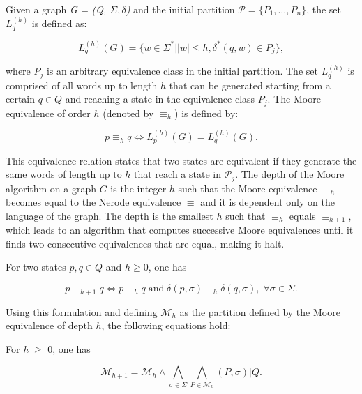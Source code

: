 {Given a graph \textit{G = (Q, $\Sigma, \delta$)} and the initial partition $\mathcal{P} = \{P_1,\ldots, P_n\}$, the set $L_q^{(h)}$ is defined as:

\[
L_q^{(h)}(G) = \{w \in \Sigma^* | |w| \leq h, \delta^*(q,w) \in P_j\},
\]

\noindent where $P_j$ is an arbitrary equivalence class in the initial partition. The set $L_q^{(h)}$ is comprised of all words up to length $h$ that can be generated starting from a certain $q \in Q$ and reaching a state in the equivalence class $P_j$. The Moore equivalence of order $h$ (denoted by $\equiv_h$) is defined by:

\[
p \equiv_h q \Leftrightarrow L_p^{(h)}(G) = L_q^{(h)}(G).
\]

\noindent This equivalence relation states that two states are equivalent if they generate the same words of length up to $h$ that reach a state in $\mathcal{P}_j$. The depth of the Moore algorithm on a graph $G$ is the integer $h$ such that the Moore equivalence $\equiv_h$ becomes equal to the Nerode equivalence $\equiv$ and it is dependent only on the language of the graph. The depth is the smallest $h$ such that $\equiv_h$ equals $\equiv_{h+1}$, which leads to an algorithm that computes successive Moore equivalences until it finds two consecutive equivalences that are equal, making it halt.

\begin{proposition}\label{prop:makemooreeasy}
For two states $p, q \in Q$ and $h \geq 0$, one has

\end{proposition}

\begin{equation}\label{eq:mooreequiv}
p \equiv_{h+1} q \Longleftrightarrow p \equiv_{h} q\; \text{and} \;\delta(p,\sigma) \equiv_h \delta(q,\sigma), \; \forall \sigma \in \Sigma.
\end{equation}

\noindent Using this formulation and defining $\mathcal{M}_h$ as the partition defined by the Moore equivalence of depth $h$, the following equations hold:

\begin{proposition}\label{prop:moorecomp}
For \textit{h} $\geq$ 0, one has

\end{proposition}

\[
\mathcal{M}_{h+1} = \mathcal{M}_h \wedge \bigwedge_{\sigma\in\Sigma} \bigwedge_{P\in\mathcal{M}_h}(P,\sigma)|Q.
\]

}
